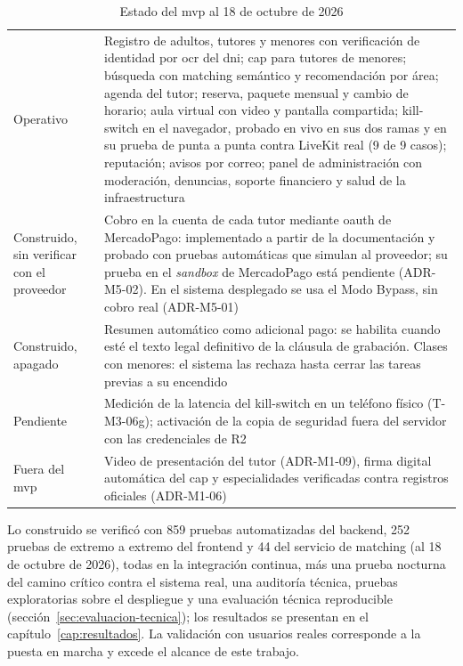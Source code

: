 \begin{table}[H]
    \centering
    \caption{Estado del \gls{mvp} al 18 de octubre de 2026}
    \label{tab:estado-mvp}
    \small
    \begin{tabularx}{\textwidth}{>{\raggedright\arraybackslash}p{3.2cm} L}
        \toprule
         &  \\
        \midrule
        Operativo & Registro de adultos, tutores y menores con verificación de identidad por \gls{ocr} del \gls{dni}; \gls{cap} para tutores de menores; búsqueda con \gls{matching} semántico y recomendación por área; agenda del tutor; reserva, paquete mensual y cambio de horario; aula virtual con video y pantalla compartida; kill-switch en el navegador, probado en vivo en sus dos ramas y en su prueba de punta a punta contra LiveKit real (9 de 9 casos); reputación; avisos por correo; panel de administración con moderación, denuncias, soporte financiero y salud de la infraestructura \\
        Construido, sin verificar con el proveedor & Cobro en la cuenta de cada tutor mediante \gls{oauth} de MercadoPago: implementado a partir de la documentación y probado con pruebas automáticas que simulan al proveedor; su prueba en el \emph{sandbox} de MercadoPago está pendiente (ADR-M5-02). En el sistema desplegado se usa el Modo Bypass, sin cobro real (ADR-M5-01) \\
        Construido, apagado & Resumen automático como adicional pago: se habilita cuando esté el texto legal definitivo de la cláusula de grabación. Clases con menores: el sistema las rechaza hasta cerrar las tareas previas a su encendido \\
        Pendiente & Medición de la latencia del kill-switch en un teléfono físico (T-M3-06g); activación de la copia de seguridad fuera del servidor con las credenciales de R2 \\
        Fuera del \gls{mvp} & Video de presentación del tutor (ADR-M1-09), firma digital automática del \gls{cap} y especialidades verificadas contra registros oficiales (ADR-M1-06) \\
        \bottomrule
    \end{tabularx}
\end{table}

Lo construido se verificó con 859 pruebas automatizadas del backend, 252
pruebas de extremo a extremo del frontend y 44 del servicio de
\gls{matching} (al 18 de octubre de 2026), todas en la integración
continua, más una prueba
nocturna del camino crítico contra el sistema real, una auditoría
técnica, pruebas exploratorias sobre el despliegue y una evaluación
técnica reproducible (sección~\ref{sec:evaluacion-tecnica}); los resultados se
presentan en el capítulo~\ref{cap:resultados}. La validación con
usuarios reales corresponde a la puesta en marcha y excede el alcance de
este trabajo.

